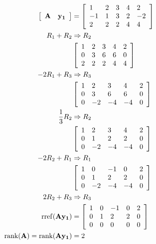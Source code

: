 \documentclass[main.tex]{subfiles}
\begin{document}
\begin{enumerate}
\begin{enumerate}
        \begin{equation}
        \begin{aligned}
            \left[\begin{array}{ll} \textbf{A} & \textbf{y\textsubscript{1}}\end{array}\right] & =
            \left[\begin{array}{lllll}
            1 & 2 & 3 & 4 & 2 \\
            -1 & 1 & 3 & 2 & -2 \\
            2 & 2 & 2 & 4 & 4
            \end{array}\right]\\
            R_1 + R_2 & \Rightarrow R_2\\
            & \left[\begin{array}{lllll}
            1 & 2 & 3 & 4 & 2 \\
            0 & 3 & 6 & 6 & 0 \\
            2 & 2 & 2 & 4 & 4
            \end{array}\right]\\
            -2R_1 + R_3 & \Rightarrow R_3\\
            & \left[\begin{array}{lllll}
            1 & 2 & 3 & 4 & 2 \\
            0 & 3 & 6 & 6 & 0 \\
            0 & -2 & -4 & -4 & 0
            \end{array}\right]\\
            \frac{1}{3}R_2 & \Rightarrow R_2\\
            & \left[\begin{array}{lllll}
            1 & 2 & 3 & 4 & 2 \\
            0 & 1 & 2 & 2 & 0 \\
            0 & -2 & -4 & -4 & 0
            \end{array}\right]\\
            -2R_2 + R_1 & \Rightarrow R_1\\
            & \left[\begin{array}{lllll}
            1 & 0 & -1 & 0 & 2 \\
            0 & 1 & 2 & 2 & 0 \\
            0 & -2 & -4 & -4 & 0
            \end{array}\right]\\
            2R_2 + R_3 & \Rightarrow R_3\\
            \operatorname{rref}(\textbf{A} \textbf{y\textsubscript{1}}) 
            & = \left[\begin{array}{lllll}
            1 & 0 & -1 & 0 & 2 \\
            0 & 1 & 2 & 2 & 0 \\
            0 & 0 & 0 & 0 & 0
            \end{array}\right]\\
            \text{rank}(\textbf{A}) = \text{rank}(\textbf{A} \textbf{y\textsubscript{1}}) & = 2
        \end{aligned}
        \end{equation}


\end{enumerate}
\end{enumerate}
\end{document}
